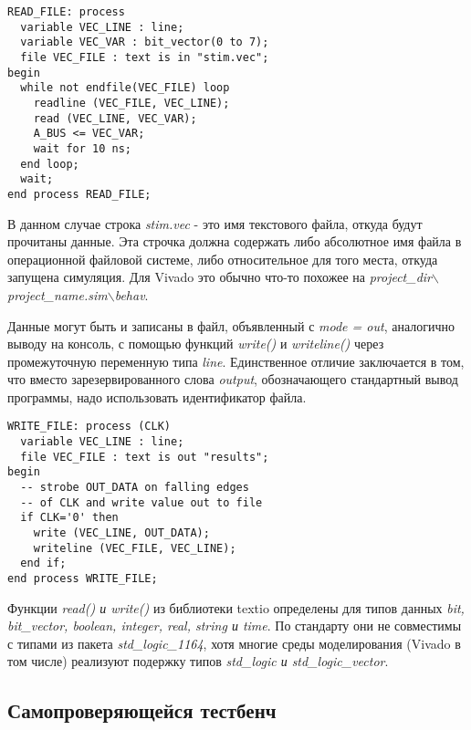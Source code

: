 \begin{Code}
\begin{lstlisting}
READ_FILE: process
  variable VEC_LINE : line;
  variable VEC_VAR : bit_vector(0 to 7);
  file VEC_FILE : text is in "stim.vec";
begin
  while not endfile(VEC_FILE) loop
    readline (VEC_FILE, VEC_LINE);
    read (VEC_LINE, VEC_VAR);
    A_BUS <= VEC_VAR;
    wait for 10 ns;
  end loop;
  wait;
end process READ_FILE;
\end{lstlisting}
\end{Code}

В данном случае строка \emph{stim.vec} - это имя текстового файла, откуда будут прочитаны данные. Эта строчка должна содержать либо абсолютное имя файла в операционной файловой системе, либо относительное для того места, откуда запущена симуляция. Для Vivado это обычно что-то похожее на \emph{project\_dir$\backslash$project\_name.sim$\backslash$behav}.

Данные могут быть и записаны в файл, объявленный с \emph{mode = out}, аналогично выводу на консоль, с помощью функций \emph{write()} и \emph{writeline()} через промежуточную переменную типа \emph{line}. Единственное отличие заключается в том, что вместо зарезервированного слова \emph{output}, обозначающего стандартный вывод программы, надо использовать идентификатор файла. 

\begin{Code}
\begin{lstlisting}
WRITE_FILE: process (CLK)
  variable VEC_LINE : line;
  file VEC_FILE : text is out "results";
begin
  -- strobe OUT_DATA on falling edges 
  -- of CLK and write value out to file
  if CLK='0' then
    write (VEC_LINE, OUT_DATA);
    writeline (VEC_FILE, VEC_LINE);
  end if; 
end process WRITE_FILE;
\end{lstlisting}
\end{Code}

Функции \emph{read() и write()} из библиотеки textio определены для типов данных \emph{bit, bit\_vector, boolean, integer, real, string и time}. По стандарту они не совместимы с типами из пакета \emph{std\_logic\_1164}, хотя многие среды моделирования (Vivado в том числе) реализуют подержку типов \emph{std\_logic и std\_logic\_vector}. 


\subsection{Самопроверяющейся тестбенч}

